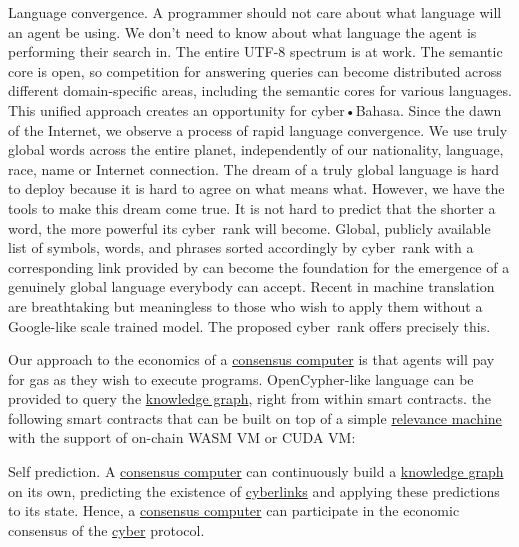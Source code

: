 \documentclass[8pt,oneside]{amsart}
\newcommand{\linkred}[2]{\href{#1}{\color{red}{#2}}}
\newcommand{\linkgreen}[2]{\href{#1}{\color{green}{#2}}}
\begin{document}
Language convergence. A programmer should not care about what language will an agent be using. We don't need to know about what language the agent is performing their search in. The entire UTF-8 spectrum is at work. The semantic core is open, so competition for answering queries can become distributed across different domain-specific areas, including the semantic cores for various languages. This unified approach creates an opportunity for cyber•Bahasa. Since the dawn of the Internet, we observe a process of rapid language convergence. We use truly global words across the entire planet, independently of our nationality, language, race, name or Internet connection. The dream of a truly global language is hard to deploy because it is hard to agree on what means what. However, we have the tools to make this dream come true. It is not hard to predict that the shorter a word, the more powerful its cyber~rank will become. Global, publicly available list of symbols, words, and phrases sorted accordingly by cyber~rank with a corresponding link provided by \linkred{https://github.com/cybercongress/cyberd}{cyberd} can become the foundation for the emergence of a genuinely global language everybody can accept. Recent \linkgreen{https://ipfs.io/ipfs/QmQUWBhDMfPKgFt3NfbxM1VU22oU8CRepUzGPBDtopwap1}{scientific advances} in machine translation are breathtaking but meaningless to those who wish to apply them without a Google-like scale trained model. The proposed cyber~rank offers precisely this.

Our approach to the economics of a {\hyperref[consensus-computer]{consensus computer}} is that agents will pay for gas as they wish to execute programs. OpenCypher-like language can be provided to query the {\hyperref[knowledge-graph]{knowledge graph}}, right from within smart contracts. \linkgreen{https://medium.com/@karpathy/software-2-0-a64152b37c35}{We can envision} the following smart contracts that can be built on top of a simple {\hyperref[relevance-machine]{relevance machine}} with the support of on-chain WASM VM or CUDA VM:

Self prediction. A {\hyperref[consensus-computer]{consensus computer}} can continuously build a {\hyperref[knowledge-graph]{knowledge graph}} on its own, predicting the existence of {\hyperref[cyberlinks]{cyberlinks}} and applying these predictions to its state. Hence, a {\hyperref[consensus-computer]{consensus computer}} can participate in the economic consensus of the {\hyperref[cyber]{cyber}} protocol.
\end{document}
